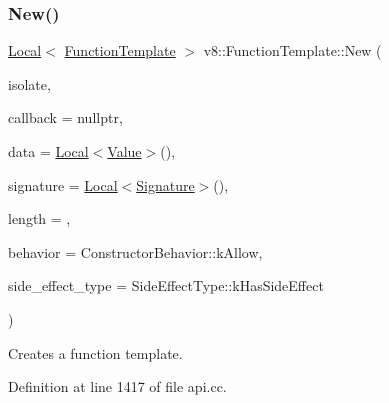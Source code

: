\mbox{\label{classv8_1_1FunctionTemplate_a55e3cc6d55e3cb089c49c7616fcb39f5}} 
\subsubsection{\texorpdfstring{New()}{New()}}
{\footnotesize\ttfamily \mbox{\hyperlink{classv8_1_1Local}{Local}}$<$ \mbox{\hyperlink{classv8_1_1FunctionTemplate}{Function\+Template}} $>$ v8\+::\+Function\+Template\+::\+New (\begin{DoxyParamCaption}\item[{Isolate $\ast$}]{isolate,  }\item[{Function\+Callback}]{callback = {\ttfamily nullptr},  }\item[{\mbox{\hyperlink{classv8_1_1Local}{v8\+::\+Local}}$<$ \mbox{\hyperlink{classv8_1_1Value}{Value}} $>$}]{data = {\ttfamily \mbox{\hyperlink{classv8_1_1Local}{Local}}$<$\mbox{\hyperlink{classv8_1_1Value}{Value}}$>$()},  }\item[{\mbox{\hyperlink{classv8_1_1Local}{v8\+::\+Local}}$<$ \mbox{\hyperlink{classv8_1_1Signature}{Signature}} $>$}]{signature = {\ttfamily \mbox{\hyperlink{classv8_1_1Local}{Local}}$<$\mbox{\hyperlink{classv8_1_1Signature}{Signature}}$>$()},  }\item[{\mbox{\hyperlink{classint}{int}}}]{length = {},  }\item[{Constructor\+Behavior}]{behavior = {\ttfamily ConstructorBehavior\+:\+:kAllow},  }\item[{\mbox{\hyperlink{namespacev8_a29711319c2b9fc7716d65faee2f7b9cb}{Side\+Effect\+Type}}}]{side\+\_\+effect\+\_\+type = {\ttfamily SideEffectType\+:\+:kHasSideEffect} }\end{DoxyParamCaption})\hspace{0.3cm}{\ttfamily [static]}}

Creates a function template. 

Definition at line 1417 of file api.\+cc.

\mbox{\label{classv8_1_1FunctionTemplate_ab648225a70140a7c4ebf4391bd917b21}} 

